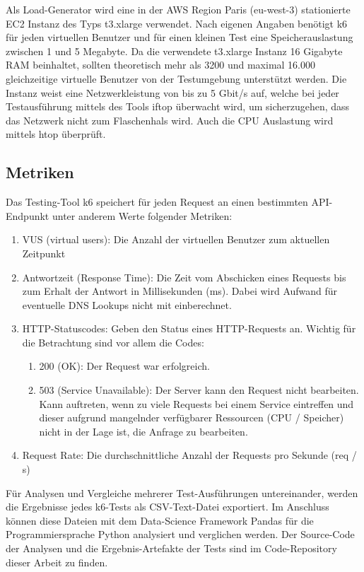 Als Load-Generator wird eine in der AWS Region Paris (eu-west-3) stationierte EC2 Instanz des Typs t3.xlarge verwendet.
Nach eigenen Angaben benötigt k6 für jeden virtuellen Benutzer und für einen kleinen Test eine Speicherauslastung zwischen 1 und 5 Megabyte\cite{noauthor_running_nodate}. Da die verwendete t3.xlarge Instanz 16 Gigabyte RAM beinhaltet, sollten theoretisch mehr als 3200 und maximal 16.000 gleichzeitige virtuelle Benutzer von der Testumgebung unterstützt werden. Die Instanz weist eine Netzwerkleistung von bis zu 5 Gbit/s auf, welche bei jeder Testausführung mittels des Tools iftop überwacht wird, um sicherzugehen, dass das Netzwerk nicht zum Flaschenhals wird. Auch die CPU Auslastung wird mittels htop überprüft.

\subsection{Metriken}
Das Testing-Tool k6 speichert für jeden Request an einen bestimmten API-Endpunkt unter anderem Werte folgender Metriken:
\begin{enumerate}
    \item VUS (virtual users): Die Anzahl der virtuellen Benutzer zum aktuellen Zeitpunkt 
    
    \item Antwortzeit (Response Time): Die Zeit vom Abschicken eines Requests bis zum Erhalt der Antwort in Millisekunden (ms). Dabei wird Aufwand für eventuelle DNS Lookups nicht mit einberechnet. 
    
    \item HTTP-Statuscodes: Geben den Status eines HTTP-Requests an. Wichtig für die Betrachtung sind vor allem die Codes:
        \begin{enumerate}
            \item 200 (OK): Der Request war erfolgreich.
            \item 503 (Service Unavailable): Der Server kann den Request nicht bearbeiten. Kann auftreten, wenn zu viele Requests bei einem Service eintreffen und dieser aufgrund mangelnder verfügbarer Ressourcen (CPU / Speicher) nicht in der Lage ist, die Anfrage zu bearbeiten.
        \end{enumerate}
        
    \item Request Rate: Die durchschnittliche Anzahl der Requests pro Sekunde (req / s)
\end{enumerate}

Für Analysen und Vergleiche mehrerer Test-Ausführungen untereinander, werden die Ergebnisse jedes k6-Tests als CSV-Text-Datei exportiert. Im Anschluss können diese Dateien mit dem Data-Science Framework Pandas\cite{noauthor_pandas_nodate} für die Programmiersprache Python analysiert und verglichen werden. Der Source-Code der Analysen und die Ergebnis-Artefakte der Tests sind im Code-Repository dieser Arbeit zu finden.

